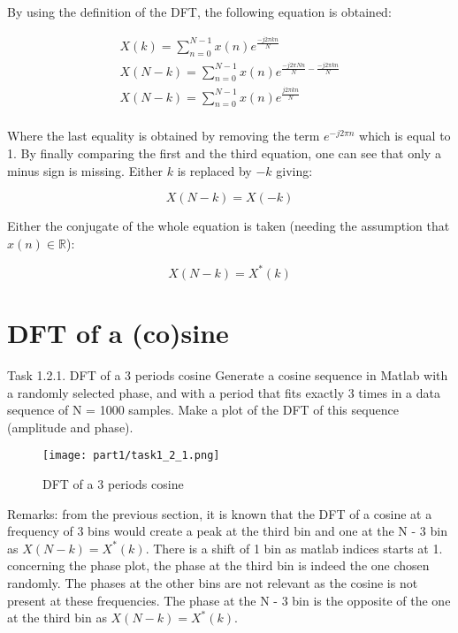By using the definition of the DFT, the following equation is obtained:

\begin{align*}
    X(k) = \sum_{n=0}^{N-1} x(n) e^{\frac{-j2\pi kn}{N}}\\
    X(N-k) = \sum_{n=0}^{N-1} x(n) e^{\frac{-j2\pi Nn}{N}-\frac{-j2\pi kn}{N}}\\
    X(N-k) = \sum_{n=0}^{N-1} x(n) e^{\frac{j2\pi kn}{N}}\\
\end{align*}

Where the last equality is obtained by removing the term $e^{-j2\pi n}$ which is equal to 1. By finally comparing the first and the third equation, one can see that only a minus sign is missing. Either $k$ is replaced by $-k$ giving:

\begin{equation*}
    X(N-k) = X(-k)
\end{equation*}

Either the conjugate of the whole equation is taken (needing the assumption that $x(n) \in \mathbb{R}$):

\begin{equation*}
    X(N-k) = X^*(k)
\end{equation*}

\section{DFT of a (co)sine}

\begin{Task}{Task 1.2.1. DFT of a 3 periods cosine}
    Generate a cosine sequence in Matlab with a randomly selected phase, and with a period that fits exactly 3 times in a data sequence of N = 1000 samples. Make a plot of the DFT of this sequence (amplitude and phase).
\end{Task}

\begin{figure}[H]
    \centering
    \texttt{[image: part1/task1\_2\_1.png]}
    \caption{DFT of a 3 periods cosine}
\end{figure}

Remarks: from the previous section, it is known that the DFT of a cosine at a frequency of 3 bins would create a peak at the third bin and one at the N - 3 bin as $X(N-k) = X^*(k)$. There is a shift of 1 bin as matlab indices starts at 1. concerning the phase plot, the phase at the third bin is indeed the one chosen randomly. The phases at the other bins are not relevant as the cosine is not present at these frequencies. The phase at the N - 3 bin is the opposite of the one at the third bin as $X(N-k) = X^*(k)$.

